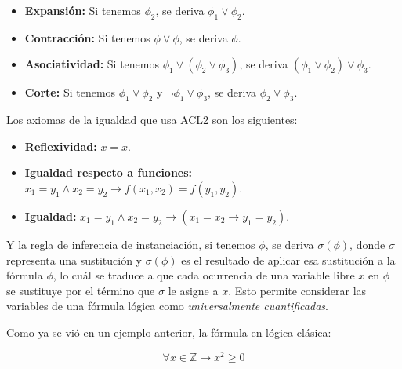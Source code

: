 \documentclass[a4paper,10pt]{article}
\begin{document}
\begin{itemize}
	\item \textbf{Expansión:} Si tenemos $\phi_2$, se deriva $\phi_1\vee\phi_2$.
	\item \textbf{Contracción:} Si tenemos $\phi\vee\phi$, se deriva $\phi$.
	\item \textbf{Asociatividad:} Si tenemos $\phi_1\vee(\phi_2\vee\phi_3)$, se deriva $(\phi_1\vee\phi_2)\vee\phi_3$.
	\item \textbf{Corte:} Si tenemos $\phi_1\vee\phi_2$ y $\neg\phi_1\vee\phi_3$, se deriva $\phi_2\vee\phi_3$.
\end{itemize}

\par\vspace{10pt}

Los axiomas de la igualdad que usa ACL2 son los siguientes:

\par\vspace{10pt}

\begin{itemize}
	\item \textbf{Reflexividad:} $x = x$.
	\item \textbf{Igualdad respecto a funciones:} $x_1=y_1\wedge x_2=y_2\to f(x_1,x_2) = f(y_1,y_2)$.
	\item \textbf{Igualdad:} $x_1=y_1\wedge x_2=y_2\to (x_1=x_2 \to y_1=y_2)$.
\end{itemize}

\par\vspace{10pt}

Y la regla de inferencia de instanciación, si tenemos $\phi$, se deriva $\sigma(\phi)$, donde $\sigma$ representa una sustitución y $\sigma(\phi)$ es el resultado de aplicar esa sustitución a la fórmula $\phi$, lo cuál se traduce a que cada ocurrencia de una variable libre $x$ en $\phi$ se sustituye por el término que $\sigma$ le asigne a $x$. Esto permite considerar las variables de una fórmula lógica como \emph{universalmente cuantificadas}.

\par\vspace{10pt}

Como ya se vió en un ejemplo anterior, la fórmula en lógica clásica:

\par\vspace{10pt}

$$
\forall x \in \mathbb{Z} \longrightarrow x^2 \geq 0
$$
\end{document}
